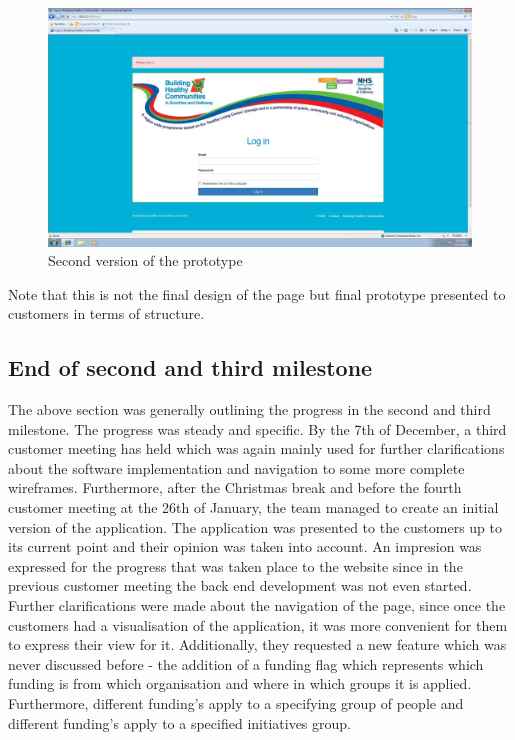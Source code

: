 \documentclass{l3proj}
\begin{document}
\begin{figure}[h]
\centerline{\includegraphics[width=\textwidth, height=\textheight, keepaspectratio]{newhome.png}}
\caption{Second version of the prototype}
\label{fig:newhome}
\end{figure}

Note that this is not the final design of the page but final prototype presented to customers in terms of structure.


\subsection{End of second and third milestone}
\label{sec:milestone23}

The above section was generally outlining the progress in the second and third milestone. The progress was steady and specific. By the 7th of December, a third customer meeting has held which was again mainly used for further clarifications about the software implementation and navigation to some more complete wireframes. Furthermore, after the Christmas break and before the fourth customer meeting at the 26th of January, the team managed to create an initial version of the application. The application was presented to the customers up to its current point and their opinion was taken into account. An impresion was expressed for the progress that was taken place to the website since in the previous customer meeting the back end development was not even started. Further clarifications were made about the navigation of the page, since once the customers had a visualisation of the application, it was more convenient for them to express their view for it. Additionally, they requested a new feature which was never discussed before - the addition of a funding flag which represents which funding is from which organisation and where in which groups it is applied. Furthermore, different funding's apply to a specifying group of people and different funding's apply to a specified initiatives group.
\end{document}
